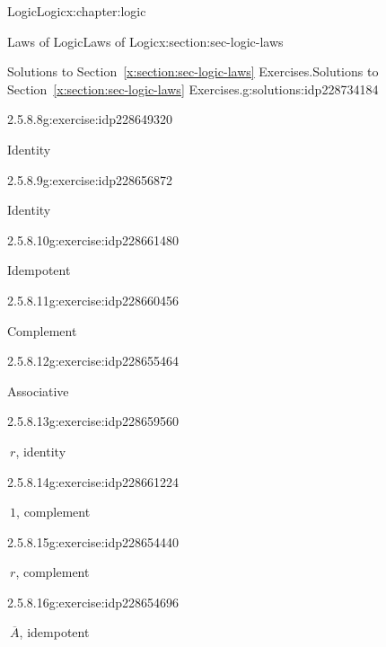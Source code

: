 \documentclass[twoside,10pt,]{book}
\newcommand{\xreffont}{\relax}
\numberwithin{equation}{section}
\begin{document}
\begin{chapterptx}{Logic}{}{Logic}{}{}{x:chapter:logic}
\begin{sectionptx}{Laws of Logic}{}{Laws of Logic}{}{}{x:section:sec-logic-laws}
\begin{solutions-subsection}{Solutions to Section~{\xreffont\ref*{x:section:sec-logic-laws}} Exercises.}{}{Solutions to Section~{\xreffont\ref*{x:section:sec-logic-laws}} Exercises.}{}{}{g:solutions:idp228734184}
\begin{exercisegroup}
\begin{divisionsolutioneg}{2.5.8.8}{}{g:exercise:idp228649320}
\par\smallskip%
\noindent\hypertarget{g:solution:idp228658408-main}{}Identity\end{divisionsolutioneg}%
\begin{divisionsolutioneg}{2.5.8.9}{}{g:exercise:idp228656872}%
\par\smallskip%
\noindent\hypertarget{g:solution:idp228659176-main}{}Identity\end{divisionsolutioneg}%
\begin{divisionsolutioneg}{2.5.8.10}{}{g:exercise:idp228661480}%
\par\smallskip%
\noindent\hypertarget{g:solution:idp228660200-main}{}Idempotent\end{divisionsolutioneg}%
\begin{divisionsolutioneg}{2.5.8.11}{}{g:exercise:idp228660456}%
\par\smallskip%
\noindent\hypertarget{g:solution:idp228657128-main}{}Complement\end{divisionsolutioneg}%
\begin{divisionsolutioneg}{2.5.8.12}{}{g:exercise:idp228655464}%
\par\smallskip%
\noindent\hypertarget{g:solution:idp228659432-main}{}Associative\end{divisionsolutioneg}%
\end{exercisegroup}
\par\medskip\noindent
\begin{exercisegroup}
\begin{divisionsolutioneg}{2.5.8.13}{}{g:exercise:idp228659560}%
\par\smallskip%
\noindent\hypertarget{g:solution:idp228655848-main}{}\(\ r\), identity\end{divisionsolutioneg}%
\begin{divisionsolutioneg}{2.5.8.14}{}{g:exercise:idp228661224}%
\par\smallskip%
\noindent\hypertarget{g:solution:idp228653672-main}{}\(\ 1\), complement\end{divisionsolutioneg}%
\begin{divisionsolutioneg}{2.5.8.15}{}{g:exercise:idp228654440}%
\par\smallskip%
\noindent\hypertarget{g:solution:idp228659048-main}{}\(\ r\), complement\end{divisionsolutioneg}%
\begin{divisionsolutioneg}{2.5.8.16}{}{g:exercise:idp228654696}%
\par\smallskip%
\noindent\hypertarget{g:solution:idp228656616-main}{}\(\ \overline{A}\), idempotent\end{divisionsolutioneg}%

\end{exercisegroup}
\end{solutions-subsection}
\end{sectionptx}
\end{chapterptx}
\end{document}
